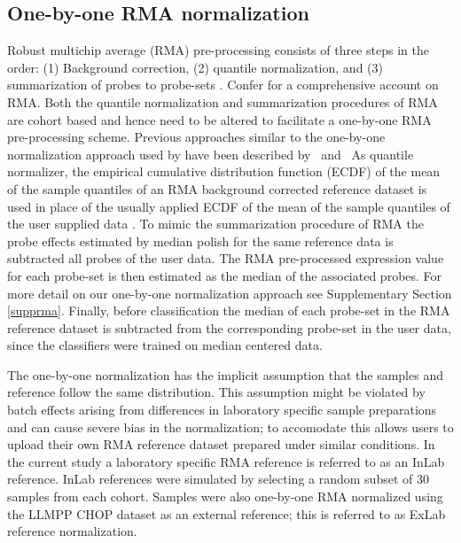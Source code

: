 \documentclass{article}
\begin{document}



\subsection{One-by-one RMA normalization}
Robust multichip average (RMA) pre-processing consists of three steps in the order:
(1) Background correction,
(2) quantile normalization, and
(3) summarization of probes to probe-sets \citep{Irizarry2003,Irizarry2003b}.
Confer \citet{Bolstad2004} for a comprehensive account on RMA.
Both the quantile normalization and summarization procedures of RMA are cohort based and hence need to be altered to facilitate a one-by-one RMA pre-processing scheme. Previous approaches similar to the one-by-one normalization approach used by \hemaClass{} have been described by \mbox{\citet{Katz2006} and \citet{McCall2010}}
As quantile normalizer, the empirical cumulative distribution function (ECDF) of the mean of the sample quantiles of an RMA background corrected reference dataset is used in place of the usually applied ECDF of the mean of the sample quantiles of the user supplied data \mbox{\citep{Bolstad2003}}.
To mimic the summarization procedure of RMA \mbox{\citep{Irizarry2003b}} the probe effects estimated by median polish for the same reference data is subtracted all probes of the user data.
The RMA pre-processed expression value for each probe-set is then estimated as the median of the associated probes. For more detail on our one-by-one normalization approach see Supplementary Section \ref{supprma}. Finally, before classification the median of each probe-set in the RMA reference dataset is subtracted from the corresponding probe-set in the user data, since the classifiers were trained on median centered data. 

The one-by-one normalization has the implicit assumption that the samples and reference follow the same distribution. This assumption might be violated by batch effects arising from differences in laboratory specific sample preparations and can cause severe bias in the normalization; to accomodate this \hemaClass{} allows users to upload their own RMA reference dataset prepared under similar conditions. In the current study a laboratory specific RMA reference is referred to as an InLab reference. InLab references were simulated by selecting a random subset of 30 samples from each cohort. Samples were also one-by-one RMA normalized using the LLMPP CHOP dataset as an external reference; this is referred to as ExLab reference normalization.
\end{document}
